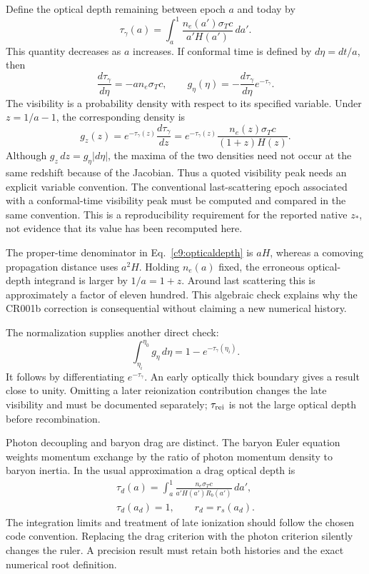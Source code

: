 Define the optical depth remaining between epoch $a$ and today by
\begin{equation}
 \tau_\gamma(a)=\int_a^1\frac{n_e(a')\sigma_Tc}{a'H(a')}\,da'.
 \label{c9:opticaldepth}
\end{equation}
This quantity decreases as $a$ increases. If conformal time is defined by $d\eta=dt/a$, then
\begin{equation}
 \frac{d\tau_\gamma}{d\eta}=-a n_e\sigma_Tc,
 \qquad g_\eta(\eta)=-\frac{d\tau_\gamma}{d\eta}e^{-\tau_\gamma}.
 \label{c9:visibility}
\end{equation}
The visibility is a probability density with respect to its specified variable. Under $z=1/a-1$, the corresponding density is
\begin{equation}
 g_z(z)=e^{-\tau_\gamma(z)}\frac{d\tau_\gamma}{dz}
 =e^{-\tau_\gamma(z)}\frac{n_e(z)\sigma_Tc}{(1+z)H(z)}.
 \label{c9:gzintegral}
\end{equation}
Although $g_z\,dz=g_\eta|d\eta|$, the maxima of the two densities need not occur at the same redshift because of the Jacobian. Thus a quoted visibility peak needs an explicit variable convention. The conventional last-scattering epoch associated with a conformal-time visibility peak must be computed and compared in the same convention. This is a reproducibility requirement for the reported native $z_*$, not evidence that its value has been recomputed here.

The proper-time denominator in Eq.~\eqref{c9:opticaldepth} is $aH$, whereas a comoving propagation distance uses $a^2H$. Holding $n_e(a)$ fixed, the erroneous optical-depth integrand is larger by $1/a=1+z$. Around last scattering this is approximately a factor of eleven hundred. This algebraic check explains why the CR001b correction is consequential without claiming a new numerical history.

The normalization supplies another direct check:
\begin{equation}
 \int_{\eta_i}^{\eta_0}g_\eta\,d\eta
 =1-e^{-\tau_\gamma(\eta_i)}.
 \label{c9:visibilitynorm}
\end{equation}
It follows by differentiating $e^{-\tau_\gamma}$. An early optically thick boundary gives a result close to unity. Omitting a later reionization contribution changes the late visibility and must be documented separately; $\tau_{\rm rei}$ is not the large optical depth before recombination.

Photon decoupling and baryon drag are distinct. The baryon Euler equation weights momentum exchange by the ratio of photon momentum density to baryon inertia. In the usual approximation a drag optical depth is
\begin{equation}
 \begin{gathered}
 \tau_d(a)=\int_a^1\frac{n_e\sigma_Tc}{a'H(a')R_b(a')}\,da',\\
 \tau_d(a_d)=1,\qquad r_d=r_s(a_d).
 \end{gathered}
 \label{c9:drag}
\end{equation}
The integration limits and treatment of late ionization should follow the chosen code convention. Replacing the drag criterion with the photon criterion silently changes the ruler. A precision result must retain both histories and the exact numerical root definition.

